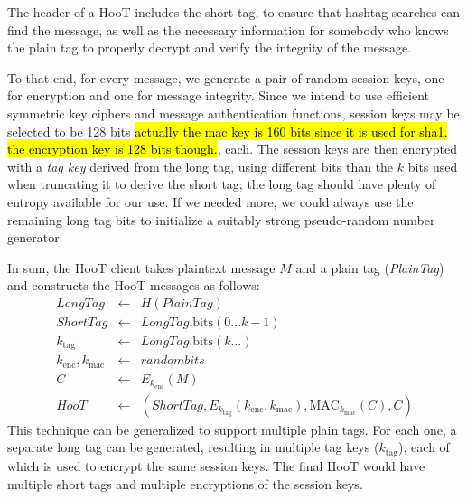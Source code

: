 %
The header of a HooT includes the short tag, to ensure that hashtag
searches can find the message, as well as the necessary information for
somebody who knows the plain tag to properly decrypt and verify the
integrity of the message.

To that end, for every message, we generate a pair of random session
keys, one for encryption and one for message integrity. Since we intend
to use efficient symmetric key ciphers and message authentication
functions, session keys may be selected to be 128 bits \hl{actually the
  mac key is 160 bits since it is used for sha1. the encryption key is
  128 bits though.},  each. The session keys
are then encrypted with a {\em tag key} derived from the long tag, using
different bits than the $k$ bits used when truncating it to derive the
short tag; the long tag should have plenty of entropy available for our
use. 
If we needed more, we could always use the remaining long tag bits
to initialize a suitably strong pseudo-random number generator.

In sum, the HooT client takes plaintext message $M$ and a plain tag
({\em PlainTag}) and constructs the HooT messages as follows:
%
\begin{eqnarray*}
\mathit{LongTag} & \leftarrow & H(\mathit{PlainTag}) \\
\mathit{ShortTag} & \leftarrow & \mathit{LongTag}.\mathrm{bits}(0 \ldots k-1) \\
k_{\mathrm{tag}} & \leftarrow & \mathit{LongTag}.\mathrm{bits}(k \ldots) \\
k_{\mathrm{enc}}, k_{\mathrm{mac}} & \leftarrow & \mathit{random bits} \\
C & \leftarrow & E_{k_{\mathrm{enc}}}(M) \\
\mathit{HooT}  & \leftarrow &  \left(\mathit{ShortTag}, E_{k_{\mathrm{tag}}} \left(k_{\mathrm{enc}}, k_{\mathrm{mac}}\right), \mathrm{MAC}_{k_{\mathrm{mac}}}(C), C\right)
\end{eqnarray*}
%
This technique can be generalized to support multiple plain tags. For
each one, a separate long tag can be generated, resulting in multiple
tag keys ($k_\mathrm{tag}$), each of which is used to encrypt the same
session keys. The final HooT would have multiple short tags and multiple
encryptions of the session keys.


